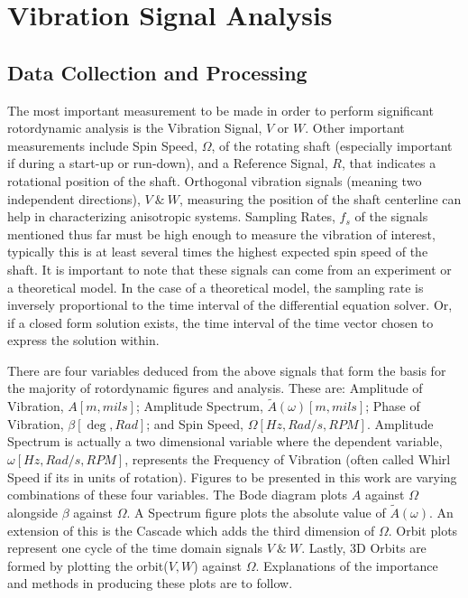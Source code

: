 \chapter{Vibration Signal Analysis}\label{VibrationSignalAnalysis}
\section{Data Collection and Processing}
The most important measurement to be made in order to perform significant rotordynamic analysis is the Vibration Signal, $ V $ or $ W $. Other important measurements include Spin Speed, $ \Omega $, of the rotating shaft (especially important if during a start-up or run-down), and a Reference Signal, $ R $, that indicates a rotational position of the shaft. Orthogonal vibration signals (meaning two independent directions), $ V\ \&\ W $, measuring the position of the shaft centerline can help in characterizing anisotropic systems. Sampling Rates, $ f_s $ of the signals mentioned thus far must be high enough to measure the vibration of interest, typically this is at least several times the highest expected spin speed of the shaft. It is important to note that these signals can come from an experiment or a theoretical model. In the case of a theoretical model, the sampling rate is inversely proportional to the time interval of the differential equation solver. Or, if a closed form solution exists, the time interval of the time vector chosen to express the solution within.\par
There are four variables deduced from the above signals that form the basis for the majority of rotordynamic figures and analysis. These are: Amplitude of Vibration, $ A[m,mils] $; Amplitude Spectrum, $ \tilde{A}(\omega)[m,mils] $; Phase of Vibration, $ \beta[\deg,Rad] $; and Spin Speed, $ \Omega[Hz,Rad/s,RPM] $. Amplitude Spectrum is actually a two dimensional variable where the dependent variable, $ \omega[Hz,Rad/s,RPM] $, represents the Frequency of Vibration (often called Whirl Speed if its in units of rotation). Figures to be presented in this work are varying combinations of these four variables. The Bode diagram plots $ A $ against $ \Omega $ alongside $ \beta $  against $ \Omega $. A Spectrum figure plots the absolute value of $ \tilde{A}(\omega) $. An extension of this is the Cascade which adds the third dimension of $ \Omega $. Orbit plots represent one cycle of the time domain signals $ V\ \&\ W $. Lastly, 3D Orbits are formed by plotting the orbit($ V,W $) against $ \Omega $. Explanations of the importance and methods in producing these plots are to follow. \par
